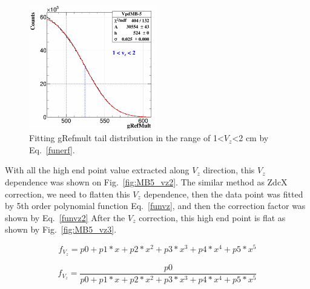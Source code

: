 \documentclass[a4paper]{article}
\begin{document}
\begin{figure}[htbp]
\centering
\includegraphics[keepaspectratio,width=0.5\textwidth]{fig/MB5_Vzcor1.png}
\caption{Fitting gRefmult tail distribution in the range of 1<$V_{z}$<2 cm by Eq.~\ref{funerf}.}
 \label{fig:MB5_vz1}
\end{figure}

With all the high end point value extracted along $V_{z}$ direction, this $V_{z}$ dependence was shown on Fig.~\ref{fig:MB5_vz2}. The similar method as ZdcX correction, we need to flatten this $V_{z}$ dependence, then the data point was fitted by 5th order polynomial function Eq.~\ref{funvz}, and then the correction factor was shown by Eq.~\ref{funvz2}
After the $V_{z}$ correction, this high end point is flat as shown by Fig.~\ref{fig:MB5_vz3}.

\begin{equation}
  f_{V_{z}} = p0 + p1*x + p2*x^2 + p3*x^3 + p4*x^4 + p5*x^5
\label{funvz}
\end{equation}

\begin{equation}
  f_{V_{z}} = \frac{p0}{p0 + p1*x + p2*x^2 + p3*x^3 + p4*x^4 + p5*x^5}
\label{funvz2}
\end{equation}
\end{document}
